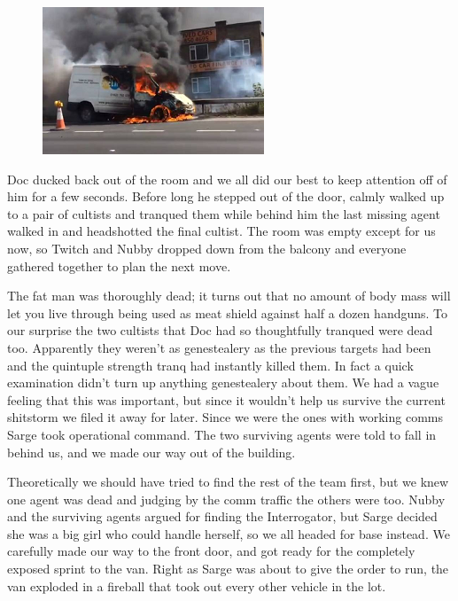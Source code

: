 \begin{figure}
	\begin{center}
		\includegraphics[width=\figwidth]{pics/5/15.png}
	\end{center}
\end{figure}
Doc ducked back out of the room and we all did our best to keep attention off of him for a few seconds. 
Before long he stepped out of the door, calmly walked up to a pair of cultists and tranqued them while behind him the last missing agent walked in and headshotted the final cultist. 
The room was empty except for us now, so Twitch and Nubby dropped down from the balcony and everyone gathered together to plan the next move.

The fat man was thoroughly dead; it turns out that no amount of body mass will let you live through being used as meat shield against half a dozen handguns. 
To our surprise the two cultists that Doc had so thoughtfully tranqued were dead too. 
Apparently they weren’t as genestealery as the previous targets had been and the quintuple strength tranq had instantly killed them. 
In fact a quick examination didn’t turn up anything genestealery about them. 
We had a vague feeling that this was important, but since it wouldn’t help us survive the current shitstorm we filed it away for later. 
Since we were the ones with working comms Sarge took operational command. 
The two surviving agents were told to fall in behind us, and we made our way out of the building.

Theoretically we should have tried to find the rest of the team first, but we knew one agent was dead and judging by the comm traffic the others were too. 
Nubby and the surviving agents argued for finding the Interrogator, but Sarge decided she was a big girl who could handle herself, so we all headed for base instead. 
We carefully made our way to the front door, and got ready for the completely exposed sprint to the van. 
Right as Sarge was about to give the order to run, the van exploded in a fireball that took out every other vehicle in the lot.

